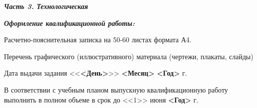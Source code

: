 \documentclass[utf8x, 14pt, oneside, a4paper]{article}
\begin{document}
	\begin{flushleft}
		\fontsize{12pt}{\baselineskip}\selectfont

		\textbf{\textit{Часть 3. Технологическая}}
		
		\uline{\hfill}

		\uline{\hfill}

		\uline{\hfill}
	\end{flushleft}

	\vfill

	\begin{flushleft}
		\fontsize{12pt}{\baselineskip}\selectfont

		\textbf{\textit{Оформление квалификационной работы:}}
		
		Расчетно-пояснительная записка на 50-60 листах формата А4.

		Перечень графического (иллюстративного) материала (чертежи, плакаты, слайды)
		
		\uline{\hfill}
		
		\uline{\hfill}
		
		\uline{\hfill}
		
		\uline{\hfill}
		
		\uline{\hfill}
		
		\uline{\hfill}
	\end{flushleft}

	\vfill

	\begin{flushleft}
		\fontsize{12pt}{\baselineskip}\selectfont

		Дата выдачи задания <<\textbf{<День>}>> \textbf{<Месяц>} \textbf{<Год>} г.

		В соответствии с учебным планом выпускную квалификационную работу выполнить в полном объеме в срок до <<1>> июня \textbf{<Год>} г.
	\end{flushleft}

	\vfill
\end{document}
